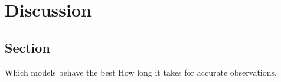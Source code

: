 
\chapter{Discussion}\label{chapter:discussion}

\section{Section}
Which models behave the best
How long it takes for accurate observations.
